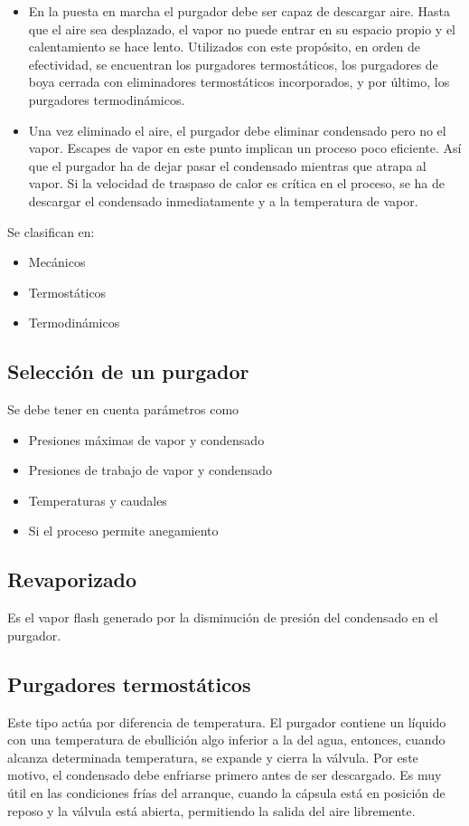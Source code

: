 \begin{itemize}
    \item En la puesta en marcha el purgador debe ser capaz de descargar aire. Hasta que el aire sea desplazado, el vapor no puede entrar en su espacio propio y el calentamiento se hace lento. Utilizados con este propósito, en orden de efectividad, se encuentran los purgadores termostáticos, los purgadores de boya cerrada con eliminadores termostáticos incorporados, y por último, los purgadores termodinámicos.
    
    \item Una vez eliminado el aire, el purgador debe eliminar condensado pero no el vapor. Escapes de vapor en este punto implican un proceso poco eficiente. Así que el purgador ha de dejar pasar el condensado mientras que atrapa al vapor. Si la velocidad de traspaso de calor es crítica en el proceso, se ha de descargar el condensado inmediatamente y a la temperatura de vapor. 
\end{itemize}

Se clasifican en:\begin{itemize}
    \item Mecánicos
    \item Termostáticos
    \item Termodinámicos
\end{itemize}

\subsection{Selección de un purgador}

Se debe tener en cuenta parámetros como \begin{itemize}
    \item Presiones máximas de vapor y condensado
    \item Presiones de trabajo de vapor y condensado
    \item Temperaturas y caudales
    \item Si el proceso permite anegamiento
\end{itemize}

\subsection{Revaporizado}

Es el vapor flash generado por la disminución de presión del condensado en el purgador.

\subsection{Purgadores termostáticos}
Este tipo actúa por diferencia de temperatura. El purgador contiene un líquido con una temperatura de ebullición algo inferior a la del agua, entonces, cuando alcanza determinada temperatura, se expande y cierra la válvula. Por este motivo, el condensado debe enfriarse primero antes de ser descargado. Es muy útil en las condiciones frías del arranque, cuando la cápsula está en posición de reposo y la válvula está abierta, permitiendo la salida del aire libremente. 


